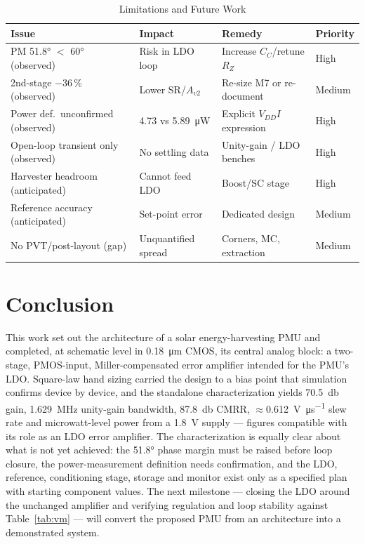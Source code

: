 \documentclass[conference]{IEEEtran}
\begin{document}
\begin{table}[!t]
\caption{Limitations and Future Work}
\label{tab:lim}
\centering\footnotesize
\begin{tabular}{@{}llll@{}}
\toprule
Issue & Impact & Remedy & Priority \\
\midrule
PM \ang{51.8} $<$ \ang{60} (observed) & Risk in LDO loop & Increase $C_C$/retune $R_Z$ & High \\
2nd-stage $-36\,\%$ (observed) & Lower SR/$A_{v2}$ & Re-size M7 or re-document & Medium \\
Power def.\ unconfirmed (observed) & 4.73 vs 5.89~\si{\micro\watt} & Explicit $V_{DD}I$ expression & High \\
Open-loop transient only (observed) & No settling data & Unity-gain / LDO benches & High \\
Harvester headroom (anticipated) & Cannot feed LDO & Boost/SC stage \cite{seeman2008} & High \\
Reference accuracy (anticipated) & Set-point error & Dedicated design \cite{seok2012} & Medium \\
No PVT/post-layout (gap) & Unquantified spread & Corners, MC, extraction & Medium \\
\bottomrule
\end{tabular}
\end{table}

\section{Conclusion}
This work set out the architecture of a solar energy-harvesting PMU and
completed, at schematic level in 0.18~\si{\micro\metre} CMOS, its central
analog block: a two-stage, PMOS-input, Miller-compensated error amplifier
intended for the PMU's LDO. Square-law hand sizing carried the design to a
bias point that simulation confirms device by device, and the standalone
characterization yields \SI{70.5}{\decibel} gain, \SI{1.629}{\mega\hertz}
unity-gain bandwidth, \SI{87.8}{\decibel} CMRR,
$\approx$\SI{0.612}{\volt\per\micro\second} slew rate and microwatt-level
power from a \SI{1.8}{\volt} supply --- figures compatible with its role as
an LDO error amplifier. The characterization is equally clear about what is
not yet achieved: the \ang{51.8} phase margin must be raised before loop
closure, the power-measurement definition needs confirmation, and the LDO,
reference, conditioning stage, storage and monitor exist only as a specified
plan with starting component values. The next milestone --- closing the LDO
around the unchanged amplifier and verifying regulation and loop stability
against Table~\ref{tab:vm} --- will convert the proposed PMU from an
architecture into a demonstrated system.
\end{document}
